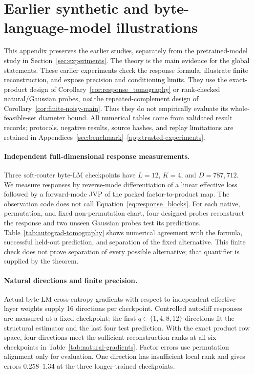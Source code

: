 \section{Earlier synthetic and byte-language-model illustrations}
\label{app:earlier-illustrations}

This appendix preserves the earlier studies, separately from the pretrained-model study in Section~\ref{sec:experiments}. The theory is the main evidence for the global statements. These earlier experiments
check the response formula, illustrate finite reconstruction, and expose
precision and conditioning limits. They use the exact-product design of
Corollary~\ref{cor:response_tomography} or rank-checked natural/Gaussian
probes, \emph{not} the repeated-complement design of
Corollary~\ref{cor:finite-noisy-main}. Thus they do not empirically evaluate
its whole-feasible-set diameter bound. All numerical tables come from
validated result records; protocols, negative results, source hashes, and
replay limitations are retained in
Appendices~\ref{sec:benchmark}--\ref{app:trusted-experiments}.

\paragraph{Independent full-dimensional response measurements.}
Three soft-router byte-LM checkpoints have $L=12$, $K=4$, and $D=787{,}712$.
We measure responses by reverse-mode differentiation of a linear effective
loss followed by a forward-mode JVP of the packed factor-to-product map.
The observation code does not call Equation~\ref{eq:response_blocks}.
For each native, permutation, and fixed non-permutation chart, four designed
probes reconstruct the response and two unseen Gaussian probes test its
predictions. Table~\ref{tab:autograd-tomography} shows numerical agreement
with the formula, successful held-out prediction, and separation of the
fixed alternative. This finite check does not prove separation of every
possible alternative; that quantifier is supplied by the theorem.



\paragraph{Natural directions and finite precision.}
Actual byte-LM cross-entropy gradients with respect to independent effective
layer weights supply 16 directions per checkpoint. Controlled autodiff
responses are measured at a fixed checkpoint; the first $q\in\{1,4,8,12\}$
directions fit the structural estimator and the last four test prediction.
With the exact product row space, four directions meet the sufficient
reconstruction ranks at all six checkpoints in
Table~\ref{tab:natural-gradients}. Factor errors use permutation alignment
only for evaluation. One direction has insufficient local rank and gives
errors $0.258$--$1.34$ at the three longer-trained checkpoints.

